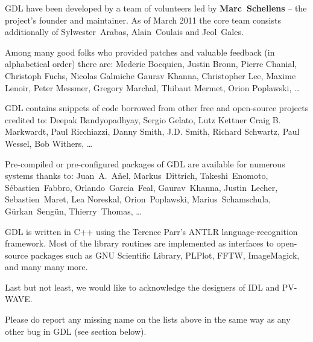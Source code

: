 GDL have been developed by a team of volunteers led by {\bf Marc~Schellens} --
  the project's founder and maintainer.
As of March 2011 the core team consists additionally of 
  Sylwester~Arabas, Alain~Coulais and Jeol~Gales.

Among many good folks who provided patches and valuable feedback (in alphabetical order) there are:
Mederic Bocquien,
Justin Bronn,
Pierre Chanial,
Christoph Fuchs,
Nicolas Galmiche
Gaurav Khanna,
Christopher Lee,
Maxime Lenoir,
Peter Messmer,
Gregory Marchal,
Thibaut Mermet,
Orion Poplawski,
\ldots

GDL contains snippets of code borrowed from other free and open-source projects credited to:
Deepak Bandyopadhyay, %
Sergio Gelato, %
Lutz Kettner %
Craig B. Markwardt, %
Paul Ricchiazzi, %
Danny Smith, %
J.D. Smith, %
Richard Schwartz, %
Paul Wessel, %
Bob Withers, %
\ldots

Pre-compiled or pre-configured packages of GDL are available for numerous systems thanks to:
Juan~A.~A\~nel, 
Markus~Dittrich, 
Takeshi~Enomoto, 
S\'ebastien~Fabbro,
Orlando~Garcia~Feal, 
Gaurav~Khanna, 
Justin~Lecher, 
Sebastien~Maret, 
Lea Noreskal, 
Orion~Poplawski, 
Marius~Schamschula, 
G\"urkan~Seng\"un, 
Thierry~Thomas,
\ldots

GDL is written in C++ using the Terence Parr's ANTLR language-recognition framework. 
Most of the library routines are implemented as interfaces to open-source packages 
  such as GNU Scientific Library, PLPlot, FFTW, ImageMagick, and many many more. 

Last but not least, we would like to acknowledge the designers of IDL and PV-WAVE.

Please do report any missing name on the lists above in the same way
  as any other bug in GDL (see section below).
